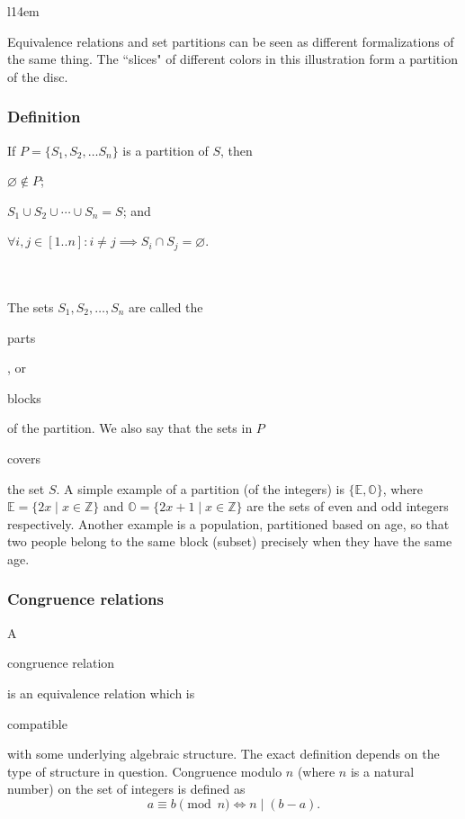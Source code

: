 \documentclass[11pt]{article}
\theoremstyle{plain}
\theoremstyle{definition}
\newenvironment{packed_items}{
\begin{itemize}
  \setlength{\itemsep}{1pt}
  \setlength{\parskip}{0pt}
  \setlength{\parsep}{0pt}
}{\end{itemize}}
\begin{document}
\begin{wrapfigure}[10]{l}{14em}
  \def\svgwidth{0.3\columnwidth}
  
\end{wrapfigure}

\noindent Equivalence relations and set partitions can be seen as different formalizations of the same thing.
The ``slices" of different colors in this illustration form a partition of the disc.

\subsubsection*{Definition}

\noindent If $ P = \{ S_1, S_2, \dots S_n \} $ is a partition of $ S $, then
\begin{packed_items}
\item $ \varnothing \notin P $;
\item $ S_1 \cup S_2 \cup \cdots \cup S_n = S $; and
\item $ \forall i, j \in [1 .. n] : i \ne j \implies S_i \cap S_j = \varnothing $.
\end{packed_items}

\ \\ \\
\noindent
The sets $ S_1, S_2, \dots, S_n $ are called the \begin{em}parts\end{em}, or \begin{em}blocks\end{em} of the partition.
We also say that the sets in $ P $ \begin{em}covers\end{em} the set $ S $.
A simple example of a partition (of the integers) is $ \{ \mathbb{E}, \mathbb{O} \} $, where $ \mathbb{E} = \{ 2x \mid x \in \mathbb{Z} \} $ and $ \mathbb{O} = \{ 2x + 1 \mid x \in \mathbb{Z} \} $ are the sets of even and odd integers respectively.
Another example is a population, partitioned based on age, so that two people belong to the same block (subset) precisely when they have the same age.

\subsubsection*{Congruence relations}

A \begin{em}congruence relation\end{em} is an equivalence relation which is \begin{em}compatible\end{em} with some underlying algebraic structure. %
The exact definition depends on the type of structure in question.
Congruence modulo $ n $ (where $ n $ is a natural number) on the set of integers is defined as
$$
  a \equiv b \pmod n \iff n \mid (b - a).
$$
\end{document}

